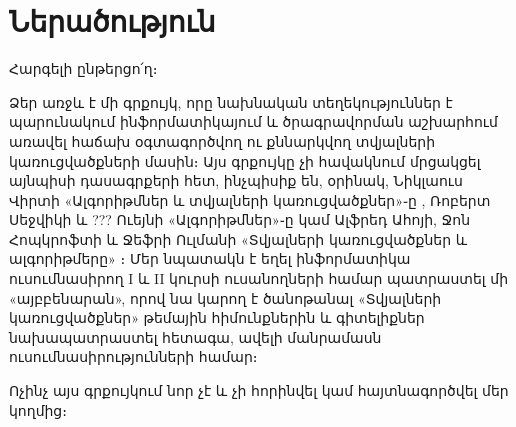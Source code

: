 
%
%
%
\chapter{Ներածություն}

Հարգելի ընթերցո՛ղ։

Ձեր առջև է մի գրքույկ, որը նախնական տեղեկություններ է պարունակում ինֆորմատիկայում և ծրագրավորման աշխարհում առավել հաճախ օգտագործվող ու քննարկվող տվյալների կառուցվածքների մասին։ Այս գրքույկը չի հավակնում մրցակցել այնպիսի դասագրքերի հետ, ինչպիսիք են, օրինակ, Նիկլաուս Վիրտի «Ալգորիթմներ և տվյալների կառուցվածքներ»֊ը \cite{nw-ads}, Ռոբերտ Սեջվիկի և ??? Ուեյնի «Ալգորիթմներ»֊ը \cite{rs-kw-al} կամ Ալֆրեդ Ահոյի, Ջոն Հոպկրոֆտի և Ջեֆրի Ուլմանի «Տվյալների կառուցվածքներ և ալգորիթմերը» \cite{ahu-dsa}։ Մեր նպատակն է եղել ինֆորմատիկա ուսումնասիրող I և II կուրսի ուսանողների համար պատրաստել մի «այբբենարան», որով նա կարող է ծանոթանալ «Տվյալների կառուցվածքներ» թեմային հիմունքներին և գիտելիքներ նախապատրաստել հետագա, ավելի մանրամասն ուսումնասիրությունների համար։ 

Ոչինչ այս գրքույկում նոր չէ և չի հորինվել կամ հայտնագործվել մեր կողմից։ 



